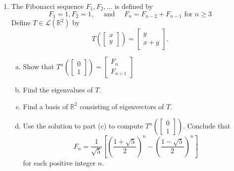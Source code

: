\documentclass[12pt,letterpaper]{article}
\theoremstyle{plain}
\theoremstyle{definition}
\begin{document}
\begin{enumerate}[1.]
\item The Fibonacci sequence $F_1, F_2, \ldots$ is defined by 
\[F_1=1, F_2=1, \quad \text{ and }\quad F_n=F_{n-2}+F_{n-1} \text{ for }n\geq 3\]
Define $T\in \mathcal{L}(\mathbb{R}^2)$ by 
\[T \left( \left[\begin{array}{c}x\\y\end{array}\right]\right)=\left[\begin{array}{cc}y\\ x+y\end{array}\right].\]
\begin{enumerate}[(a)]
\item Show that $T^n\left(\left[\begin{array}{c}0\\1\end{array}\right]\right)=\left[\begin{array}{c}F_n\\F_{n+1}\end{array}\right]$
\item Find the eigenvalues of $T$.
\item Find a basis of $\mathbb{R}^2$ consisting of eigenvectors of $T$. 
\item Use the solution to part (c) to compute $T^n\left(\left[\begin{array}{c}0\\1\end{array}\right]\right)$. Conclude that 
\[F_n=\frac{1}{\sqrt{5}}\left[\left(\frac{1+\sqrt{5}}{2}\right)^n-\left(\frac{1-\sqrt{5}}{2}\right)^n\right]\]
for each positive integer $n$. 
\end{enumerate}
\end{enumerate}
\end{document}
